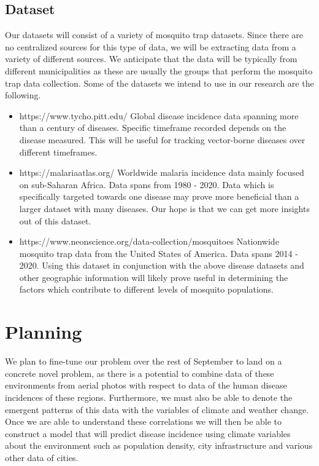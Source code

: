 \documentclass[11pt]{article}
\begin{document}
\subsection{Dataset}
Our datasets will consist of a variety of mosquito trap datasets. Since there are no centralized sources for this type of data, we will be extracting data from a variety of different sources. We anticipate that the data will be typically from different municipalities as these are usually the groups that perform the mosquito trap data collection. Some of the datasets we intend to use in our research are the following.

\begin{itemize}
	\item https://www.tycho.pitt.edu/
	Global disease incidence data spanning more than a century of diseases. Specific timeframe recorded depends on the disease measured. This will be useful for tracking vector-borne diseases over different timeframes.
	
	\item https://malariaatlas.org/
	Worldwide malaria incidence data mainly focused on sub-Saharan Africa. Data spans from 1980 - 2020. Data which is specifically targeted towards one disease may prove more beneficial than a larger dataset with many diseases. Our hope is that we can get more insights out of this dataset.
	\item https://www.neonscience.org/data-collection/mosquitoes
	Nationwide mosquito trap data from the United States of America. Data spans 2014 - 2020. Using this dataset in conjunction with the above disease datasets and other geographic information will likely prove useful in determining the factors which contribute to different levels of mosquito populations.
\end{itemize}

\section{Planning}
We plan to fine-tune our problem over the rest of September to land on a concrete novel problem, as there is a potential to combine data of these environments from aerial photos with respect to data of the human disease incidences of these regions. Furthermore, we must also be able to denote the emergent patterns of this data with the variables of climate and weather change. Once we are able to understand these correlations we will then be able to construct a model that will predict disease incidence using climate variables about the environment such as population density, city infrastructure and various other data of cities.
\end{document}
